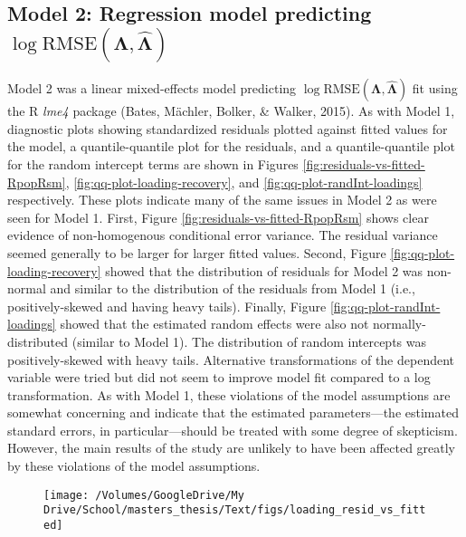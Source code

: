 \documentclass[
  english,
  man]{apa6}
\begin{document}
\begin{appendix}
{\subsection{\texorpdfstring{Model 2: Regression model predicting
\(\log \textrm{RMSE}(\mathbf{\Lambda}, \hat{\mathbf{\Lambda}})\)}{Model 2: Regression model predicting \textbackslash log \textbackslash textrm\{RMSE\}(\textbackslash mathbf\{\textbackslash Lambda\}, \textbackslash hat\{\textbackslash mathbf\{\textbackslash Lambda\}\})}}\label{model-2-regression-model-predicting-log-textrmrmsemathbflambda-hatmathbflambda}}

Model 2 was a linear mixed-effects model predicting
\(\log \textrm{RMSE}(\mathbf{\Lambda}, \hat{\mathbf{\Lambda}})\) fit
using the R \emph{lme4} package (Bates, Mächler, Bolker, \& Walker,
2015). As with Model 1, diagnostic plots showing standardized residuals
plotted against fitted values for the model, a quantile-quantile plot
for the residuals, and a quantile-quantile plot for the random intercept
terms are shown in Figures \ref{fig:residuals-vs-fitted-RpopRsm},
\ref{fig:qq-plot-loading-recovery}, and
\ref{fig:qq-plot-randInt-loadings} respectively. These plots indicate
many of the same issues in Model 2 as were seen for Model 1. First,
Figure \ref{fig:residuals-vs-fitted-RpopRsm} shows clear evidence of
non-homogenous conditional error variance. The residual variance seemed
generally to be larger for larger fitted values. Second, Figure
\ref{fig:qq-plot-loading-recovery} showed that the distribution of
residuals for Model 2 was non-normal and similar to the distribution of
the residuals from Model 1 (i.e., positively-skewed and having heavy
tails). Finally, Figure \ref{fig:qq-plot-randInt-loadings} showed that
the estimated random effects were also not normally-distributed (similar
to Model 1). The distribution of random intercepts was positively-skewed
with heavy tails. Alternative transformations of the dependent variable
were tried but did not seem to improve model fit compared to a log
transformation. As with Model 1, these violations of the model
assumptions are somewhat concerning and indicate that the estimated
parameters---the estimated standard errors, in particular---should be
treated with some degree of skepticism. However, the main results of the
study are unlikely to have been affected greatly by these violations of
the model assumptions.

\begin{figure}

{\centering \texttt{[image: /Volumes/GoogleDrive/My Drive/School/masters\_thesis/Text/figs/loading\_resid\_vs\_fitted]} 

}
\end{figure}
\end{appendix}
\end{document}
